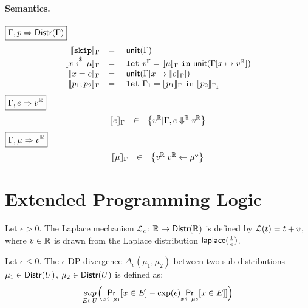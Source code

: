 \documentclass[a4paper,11pt]{article}
\begin{document}
\paragraph{Semantics.}
$\boxed{\Gamma, p \Rightarrow \mathsf{Distr}(\Gamma)}$
\[
	\begin{array}{rcl}
	\llbracket \mathtt{skip} \rrbracket_{\Gamma}
	& = & 
	~\mathsf{unit}(\Gamma)
	\\
	\llbracket x \xleftarrow{\$} \mu \rrbracket_{\Gamma}
	& = & 
	~\mathtt{let}~ v^{\mathbb{F}} = \llbracket \mu \rrbracket_{\Gamma} 
	~\mathtt{in}~ 
	\mathsf{unit}(\Gamma[x \mapsto v^{\mathbb{R}}])
	\\
	\llbracket x = e \rrbracket_{\Gamma}
	& = &  
	~\mathsf{unit}(\Gamma[x \mapsto \llbracket e \rrbracket_{\Gamma}])
	\\
	\llbracket p_1; p_2 \rrbracket_{\Gamma}
	& = &  ~\mathtt{let}~  \Gamma_1 = 
	\llbracket p_1 \rrbracket_{\Gamma} ~\mathtt{in}~
	\llbracket p_2 \rrbracket_{\Gamma_1} 
	\end{array}
\]
$\boxed{\Gamma, e \Rightarrow v^{\mathbb{R}}}$
\[
	\begin{array}{rcl}
	\llbracket e \rrbracket_{\Gamma}
	& \in &  
	\big\{v^{\mathbb{R}} |
	\Gamma,  
	e \Downarrow^{\mathbb{R}} v^{\mathbb{R}} \big\}
	\end{array}
\]
$\boxed{\Gamma, \mu \Rightarrow v^{\mathbb{R}}}$
\[
	\begin{array}{rcl}
	\llbracket \mu \rrbracket_{\Gamma}
	& \in & 
	\big\{ v^{\mathbb{R}} |
	v^{\mathbb{R}} \leftarrow \mu^{\diamond} \big\}
	\end{array}
\]



\section{Extended Programming Logic\cite{barthe2016proving}}
\begin{defn}
Let $\epsilon > 0$. The Laplace mechanism  $\mathcal{L}_{\epsilon}$: $\mathbb{R} \to \mathsf{Distr}(\mathbb{R})$ is defined by $\mathcal{L}(t) = t + v$, where $v \in \mathbb{R}$ is drawn from the Laplace distribution $\mathsf{laplace}(\frac{1}{\epsilon})$.
\end{defn}

\begin{defn}
Let $\epsilon \leq 0$. The $\epsilon${\text -DP divergence} $\Delta_{\epsilon}(\mu_1, \mu_2)$ between two sub-distributions $\mu_1 \in \mathsf{Distr}(U)$, $\mu_2 \in \mathsf{Distr}(U)$ is defined as:
\[	
	\underset{E \in U}{sup}\Big(\underset{x \leftarrow \mu_1}{\mathsf{Pr}}[x \in E] - \exp(\epsilon) \underset{x \leftarrow \mu_2}{\mathsf{Pr}}[x \in  E]]\Big)
\]

\end{defn}
\end{document}
